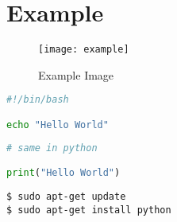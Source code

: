 \section{Example}

\begin{figure}[H]
    \begin{center} 
        \texttt{[image: example]}
        \caption{Example Image}
        \label{fig:example}
    \end{center}
\end{figure}

\cite[vgl. dazu][]{example-book}

\cite[vgl. dazu][]{example-online}

\newpage

\begin{lstlisting}[language=Bash]
#!/bin/bash

echo "Hello World"
\end{lstlisting}

\begin{lstlisting}[language=Python]
# same in python

print("Hello World")
\end{lstlisting}

\begin{verbatim}
$ sudo apt-get update
$ sudo apt-get install python
\end{verbatim}
